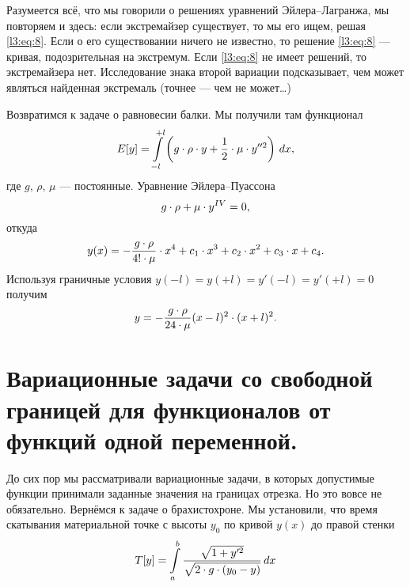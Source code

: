 \documentclass[12pt,a4paper,openany,fleqn]{book}
\theoremstyle{definition}
\begin{document}
	 Разумеется всё, что мы говорили о решениях уравнений Эйлера--Лагранжа, мы повторяем и здесь: если экстремайзер существует, то мы его ищем, решая \eqref{l3:eq:8}. Если о его существовании ничего не известно, то решение \eqref{l3:eq:8} --- кривая, подозрительная на экстремум. Если \eqref{l3:eq:8} не имеет решений, то экстремайзера нет. Исследование знака второй вариации подсказывает, чем может являться найденная экстремаль (точнее --- чем не может\dots)
	 
	 Возвратимся к задаче о равновесии балки. Мы получили там функционал 
	 \begin{equation*}
	 	\hfill E[y]=\int\limits_{-l}^{+l}\left(g\cdot\rho\cdot y+\frac12\cdot\mu\cdot y^{\prime\prime2}\right)\,dx,\hfill
	 \end{equation*}
 	 где $g$, $\rho$, $\mu$ --- постоянные.
 Уравнение Эйлера--Пуассона 
 \begin{equation*}
 	\hfill g\cdot\rho+\mu\cdot y^{IV}=0,\hfill
 \end{equation*}
 откуда
 \begin{equation*}
 	\hfill y(x)=-\frac{g\cdot\rho}{4!\cdot\mu}\cdot x^4+c_1\cdot x^3+c_2\cdot x^2+c_3\cdot x+c_4.\hfill
 \end{equation*}
Используя граничные условия $y(-l)=y(+l)=y'(-l)=y'(+l)=0$ получим
\begin{equation*}
	\hfill y=-\frac{g\cdot\rho}{24\cdot\mu}(x-l)^2\cdot(x+l)^2.\hfill
\end{equation*} 

\section[Задачи со свободными концами.]{Вариационные задачи со свободной границей для функционалов от функций одной переменной.}
\label{lecture3section2}
До сих пор мы рассматривали вариационные задачи, в которых допустимые функции принимали заданные значения на границах отрезка. Но это вовсе не обязательно. Вернёмся к задаче о брахистохроне. Мы установили, что время скатывания материальной точке с высоты $y_0$ по кривой $y(x)$ до правой стенки 
\begin{equation*}
	\hfill T[y]=\int\limits_a^b\frac{\sqrt{1+y^{\prime2}}}{\sqrt{2\cdot g\cdot(y_0-y)}}\,dx\hfill
\end{equation*}

\end{document}
